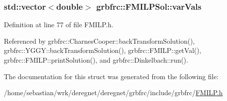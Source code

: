 \subsubsection[{\texorpdfstring{var\+Vals}{varVals}}]{\setlength{\rightskip}{0pt plus 5cm}std\+::vector$<$double$>$ grbfrc\+::\+F\+M\+I\+L\+P\+Sol\+::var\+Vals}\hypertarget{structgrbfrc_1_1FMILPSol_a36afbb370bb174c488c46b882c0c9bbf}{}\label{structgrbfrc_1_1FMILPSol_a36afbb370bb174c488c46b882c0c9bbf}


Definition at line 77 of file F\+M\+I\+L\+P.\+h.



Referenced by grbfrc\+::\+Charnes\+Cooper\+::back\+Transform\+Solution(), grbfrc\+::\+Y\+G\+G\+Y\+::back\+Transform\+Solution(), grbfrc\+::\+F\+M\+I\+L\+P\+::get\+Val(), grbfrc\+::\+F\+M\+I\+L\+P\+::print\+Solution(), and grbfrc\+::\+Dinkelbach\+::run().



The documentation for this struct was generated from the following file\+:\begin{DoxyCompactItemize}
\item 
/home/sebastian/wrk/deregnet/deregnet/grbfrc/include/grbfrc/\hyperlink{FMILP_8h}{F\+M\+I\+L\+P.\+h}\end{DoxyCompactItemize}
